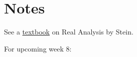 \section{Notes}

See a \href{http://home.ustc.edu.cn/~matchbox/Real%20Analysis%20Stein.pdf}{textbook} on Real Analysis by Stein.

For upcoming week 8: 
